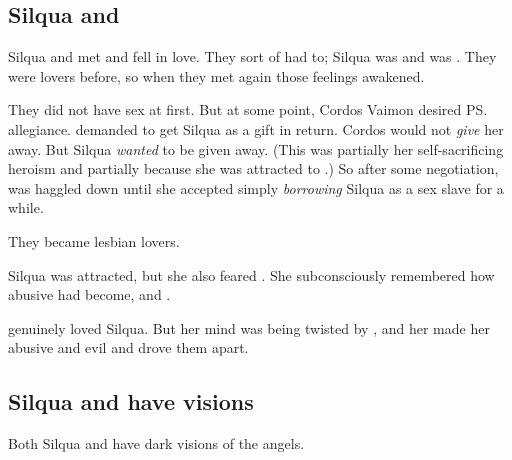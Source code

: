 \subsection{Silqua and \Delphine}
Silqua and \Delphine{} met and fell in love. 
They sort of had to; Silqua was \Aryal{} and \Delphine{} was \Shiaraid. 
They were lovers before, so when they met again those feelings awakened. 

They did not have sex at first. 
But at some point, Cordos Vaimon desired \ps{\Delphine} allegiance. 
\Delphine{} demanded to get Silqua as a gift in return. 
Cordos would not \emph{give} her away. 
But Silqua \emph{wanted} to be given away. 
(This was partially her self-sacrificing heroism and partially because she was attracted to \Delphine{}.)
So after some negotiation, \Delphine{} was haggled down until she accepted simply \emph{borrowing} Silqua as a sex slave for a while. 

They became lesbian lovers. 

Silqua was attracted, but she also feared \Delphine. 
She subconsciously remembered how abusive \Delphine{} had become, and . 

\Delphine{} genuinely loved Silqua. 
But her mind was being twisted by , and her  made her abusive and evil and drove them apart. 











\subsection{Silqua and \Delphine{} have visions}
Both Silqua and \Delphine{} have dark visions of the angels.


